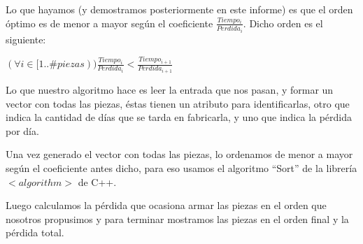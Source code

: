 Lo que hayamos (y demostramos posteriormente en este informe) es que el orden óptimo es de menor a mayor según el coeficiente $\frac{Tiempo_i}{Perdida_i}$. Dicho orden es el siguiente:

$(\forall i \in [1..\#{piezas})) \frac{Tiempo_i}{Perdida_i} < \frac{Tiempo_{i+1}}{Perdida_{i+1}}$

Lo que nuestro algoritmo hace es leer la entrada que nos pasan, y formar un vector con todas las piezas, éstas tienen un atributo para identificarlas, otro que indica la cantidad de días que se tarda en fabricarla, y uno que indica la pérdida por día.

Una vez generado el vector con todas las piezas, lo ordenamos de menor a mayor según el coeficiente antes dicho, para eso usamos el algoritmo ``Sort'' de la librería \emph{$<algorithm>$} de C++.

Luego calculamos la pérdida que ocasiona armar las piezas en el orden que nosotros propusimos y para terminar mostramos las piezas en el orden final y la pérdida total.